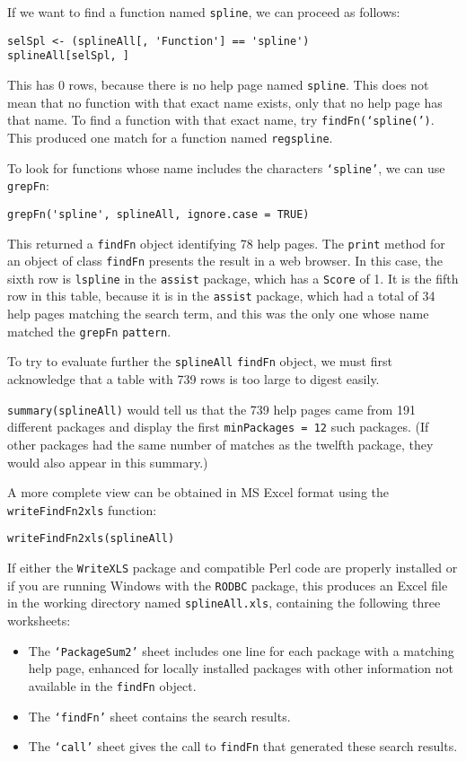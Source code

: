 If we want to find a function named {\tt spline}, we can
proceed as follows:
\begin{verbatim}
selSpl <- (splineAll[, 'Function'] == 'spline')
splineAll[selSpl, ]
\end{verbatim}
This has 0 rows, because there is no help page named
{\tt spline}.  This does not mean that no function
with that exact name exists, only that no help page
has that name.  To find a function with that exact
name, try {\tt findFn(`spline(')}.  This produced one match
for a function named {\tt regspline}.

To look for functions whose name includes the characters
{\tt `spline'},
we can use {\tt grepFn}:
\begin{verbatim}
grepFn('spline', splineAll, ignore.case = TRUE)
\end{verbatim}
This returned a {\tt findFn} object identifying 78 help pages.
The {\tt print} method for an object of class {\tt findFn}
presents the result in a web browser.  In this case,
the sixth row is {\tt lspline} in the
{\tt assist} package, which has a {\tt Score} of 1.  It
is the fifth row in this table, because it is in the
{\tt assist} package, which had a total of 34 help
pages matching the search term, and this was the only
one whose name matched the {\tt grepFn} {\tt pattern}.

To try to evaluate further the {\tt splineAll} {\tt findFn}
object, we must first acknowledge that a table with 739 rows
is too large to digest easily.

{\tt summary(splineAll)} would tell us that the 739 help pages
came from 191 different packages and display the first
{\tt minPackages = 12} such packages.
(If other packages had the same number of
matches as the twelfth package, they would also appear in this
summary.)

A more complete view can be obtained in MS Excel format
using the {\tt writeFindFn2xls} function:
\begin{verbatim}
writeFindFn2xls(splineAll)
\end{verbatim}
If either the {\tt WriteXLS} package and compatible Perl code
are properly installed or if you are running Windows with
the {\tt RODBC} package, this produces an Excel file in the 
working directory named {\tt splineAll.xls}, containing the
following three worksheets:

\begin{itemize}
\item{The {\tt `PackageSum2'} sheet includes one line for each 
package with a matching help page, enhanced for locally 
installed packages with other 
information not available in the {\tt findFn} object.}
\item{The {\tt `findFn'} sheet contains the search results.}
\item{The {\tt `call'} sheet gives the call to {\tt findFn}
that generated these search results.}
\end{itemize}


